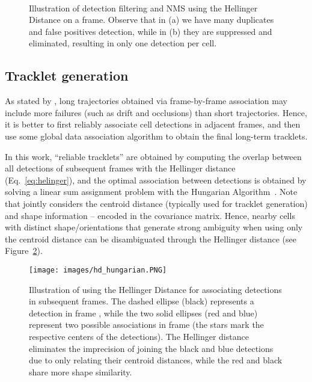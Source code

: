 \documentclass{article}
\begin{document}
\begin{figure}[]
    \centering
    ~~
    \caption[Illustration of detection filtering and NMS using the Helinger Distance on a frame.]{Illustration of detection filtering and NMS using the Hellinger Distance on a frame. Observe that in (a) we have many duplicates and false positives detection, while in (b) they are suppressed and eliminated, resulting in only one detection per cell.}
    \label{fig:hd_nms}
\end{figure}

\subsection{Tracklet generation}

As stated by \cite{bise}, long trajectories obtained via frame-by-frame association may include more failures (such as drift and occlusions) than short trajectories. Hence, it is better to first reliably associate cell detections in adjacent frames,  and then use some global data association algorithm to obtain the final long-term tracklets. 

In this work, ``reliable tracklets'' are obtained by computing the overlap between all detections of subsequent frames with the Hellinger distance (Eq.~\eqref{eq:helinger}), and the optimal association between detections is obtained by solving a linear sum assignment problem with the Hungarian Algorithm~\cite{kuhn1955hungarian}. Note that  jointly considers the centroid distance (typically used for tracklet generation) and shape information -- encoded in the covariance matrix. Hence, nearby cells with distinct shape/orientations that generate strong ambiguity when using only the centroid distance can be disambiguated through the Hellinger distance (see Figure~\ref{fig:hd_hungarian}).

\begin{figure}[]
    \centering
    \texttt{[image: images/hd\_hungarian.PNG]}
    \caption[Illustration of using the Helinger Distance for associating detections in subsequent frames.]{Illustration of using the Hellinger Distance for associating detections in subsequent frames. The dashed ellipse (black) represents a detection in frame , while the two solid ellipses (red and blue) represent two possible associations in frame  (the stars mark the respective centers of the detections).     The Hellinger distance eliminates the imprecision of joining the black and blue detections due to only relating their centroid distances, while the red and black share more shape similarity.}
    \label{fig:hd_hungarian}
\end{figure}
\end{document}
